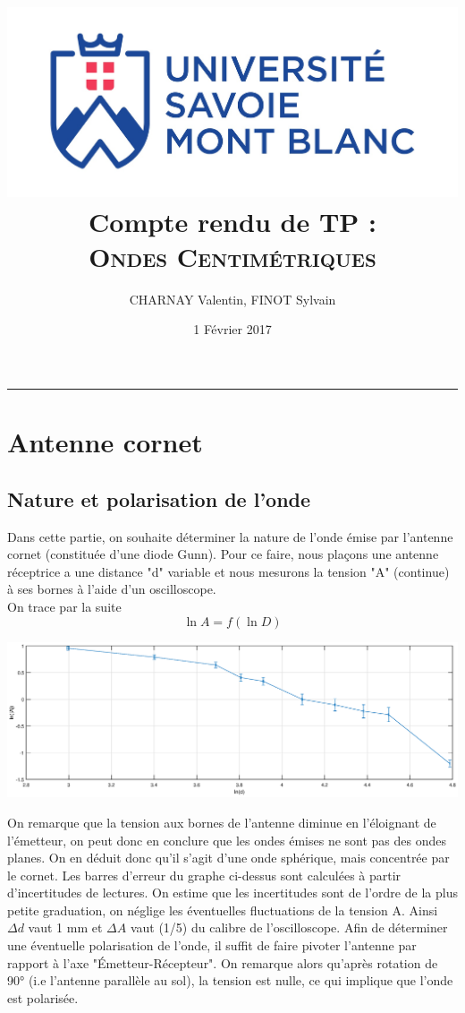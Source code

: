 \documentclass[12pt,a4paper]{article}
\author{CHARNAY Valentin, FINOT Sylvain}
\title{\includegraphics[scale=0.3]{logousmb}\\
Compte rendu de TP : \\ \scshape Ondes Centimétriques}
\date{1 Février 2017}
\begin{document}
	\maketitle
	\rule{\linewidth}{0.4pt}
	\section{Antenne cornet}
	\subsection{Nature et polarisation de l'onde}
	Dans cette partie, on souhaite déterminer la nature de l'onde émise par l'antenne cornet (constituée d'une diode Gunn). Pour ce faire, nous plaçons une antenne réceptrice a une distance "d" variable et nous mesurons la tension "A" (continue) à ses bornes à l'aide d'un oscilloscope.\\
	On trace par la suite
	$$\ln A = f(\ln D)$$
	\begin{bigcenter}
		\includegraphics[scale=0.5]{matlab/lnA}
	\end{bigcenter}
	On remarque que la tension aux bornes de l'antenne diminue en l'éloignant de l'émetteur, on peut donc en conclure que les ondes émises ne sont pas des ondes planes. On en déduit donc qu'il s'agit d'une onde sphérique, mais concentrée par le cornet. Les barres d'erreur du graphe ci-dessus sont calculées à partir d'incertitudes de lectures. On estime que les incertitudes sont de l'ordre de la plus petite graduation, on néglige les éventuelles fluctuations de la tension A. Ainsi $\Delta d$ vaut 1 mm et $\Delta A$ vaut (1/5) du calibre de l'oscilloscope.
	Afin de déterminer une éventuelle polarisation de l'onde, il suffit de faire pivoter l'antenne par rapport à l'axe "Émetteur-Récepteur". On remarque alors qu'après rotation de 90° (i.e l'antenne parallèle au sol), la tension est nulle, ce qui implique que l'onde est polarisée.
\end{document}

